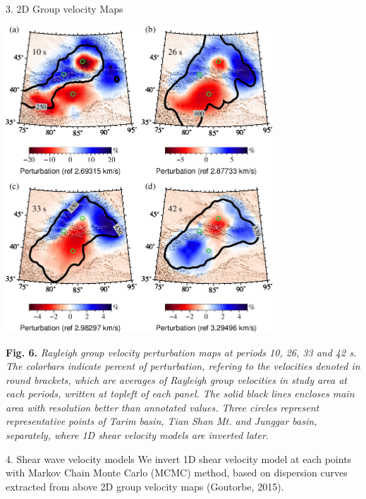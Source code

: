 \documentclass[
    landscape,      %
    paperwidth = 1200mm,
    paperheight = 900mm,
    fontscale = 0.4,
    margin = 1.7cm,
]{baposter}
\begin{document}
\begin{poster}
\begin{posterbox}[column=1]{3. 2D Group velocity Maps}
\begin{center}
\includegraphics[width=0.75\textwidth]{./images/maps.png}
\begin{minipage}{0.9\textwidth}
\footnotesize
\vspace{0.2em}
\textbf{Fig. 6.}
\itshape
Rayleigh group velocity perturbation maps at periods
10, 26, 33 and 42 s. The colorbars indicate percent of perturbation, refering to the velocities
denoted in round brackets, which are averages of Rayleigh group velocities in study area at each periods, written
at topleft of each panel. The solid black lines encloses main area with resolution better than
annotated values. Three circles represent representative points of Tarim basin, Tian Shan Mt.
and Junggar basin, separately, where 1D shear velocity models are inverted later.
\end{minipage}
\end{center}

\end{posterbox}

\begin{posterbox}[column=2 ]{4. Shear wave velocity models}
We invert 1D shear velocity model at each points with Markov Chain Monte
Carlo (MCMC) method, based on dispersion curves extracted from above 2D group velocity
maps (Goutorbe, 2015).


\end{posterbox}
\end{poster}
\end{document}
